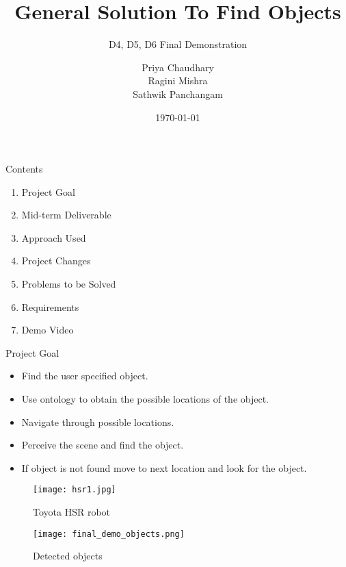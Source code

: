 \documentclass[aspectratio=169]{beamer}
\author{%
Priya Chaudhary \\
Ragini Mishra \\ 
Sathwik Panchangam 
}
\title{General Solution To Find Objects}
\subtitle{D4, D5, D6 Final Demonstration}
\institute[HBRS]{Hochschule Bonn-Rhein-Sieg}
\date{\today}
\begin{document}
{
\begin{frame}
\titlepage
\end{frame}
}

\begin{frame}{Contents}
\begin{enumerate}
  \item Project Goal
  \item Mid-term Deliverable
  \item Approach Used
  \item Project Changes
  \item Problems to be Solved
  \item Requirements
  \item Demo Video
  
\end{enumerate}
\end{frame}

\begin{frame}{Project Goal}
    \begin{multicols}{2}
        \begin{itemize}
            \item Find the user specified object.
            \item Use ontology to obtain the possible locations of the object.
            \item Navigate through possible locations.
            \item Perceive the scene and find the object.
            \item If object is not found move to next location and look for the object.
        \end{itemize}
        \vfill
        \begin{figure}[h!]
    	    \centering
    	    \texttt{[image: hsr1.jpg]}
    	    \caption{Toyota HSR robot}
        \end{figure}
        \begin{figure}
            \centering
            \texttt{[image: final\_demo\_objects.png]}
            \caption{Detected objects}
            \label{fig:my_label}
        \end{figure}
    \end{multicols}
\end{frame}
\end{document}
